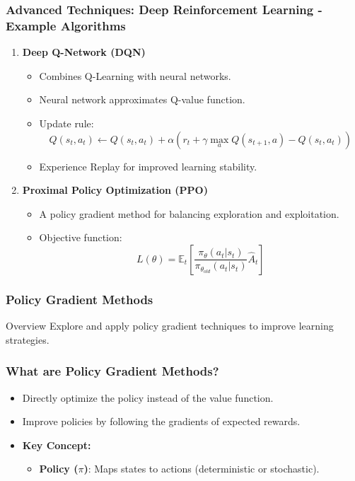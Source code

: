 \documentclass[aspectratio=169]{beamer}
\begin{document}
\begin{frame}[fragile]
    \frametitle{Advanced Techniques: Deep Reinforcement Learning - Example Algorithms}
    \begin{enumerate}
        \item \textbf{Deep Q-Network (DQN)}
        \begin{itemize}
            \item Combines Q-Learning with neural networks.
            \item Neural network approximates Q-value function.
            \item Update rule: 
            \begin{equation}
                Q(s_t, a_t) \leftarrow Q(s_t, a_t) + \alpha \left( r_t + \gamma \max_{a} Q(s_{t+1}, a) - Q(s_t, a_t) \right)
            \end{equation}
            \item Experience Replay for improved learning stability.
        \end{itemize}
        \item \textbf{Proximal Policy Optimization (PPO)}
        \begin{itemize}
            \item A policy gradient method for balancing exploration and exploitation.
            \item Objective function:
            \begin{equation}
                L(\theta) = \mathbb{E}_t \left[ \frac{\pi_\theta(a_t|s_t)}{\pi_{\theta_{old}}(a_t|s_t)} \hat{A}_t \right]
            \end{equation}
        \end{itemize}
    \end{enumerate}
\end{frame}

\begin{frame}[fragile]
    \frametitle{Policy Gradient Methods}
    \begin{block}{Overview}
        Explore and apply policy gradient techniques to improve learning strategies.
    \end{block}
\end{frame}

\begin{frame}[fragile]
    \frametitle{What are Policy Gradient Methods?}
    \begin{itemize}
        \item Directly optimize the policy instead of the value function.
        \item Improve policies by following the gradients of expected rewards.
        \item \textbf{Key Concept:} 
            \begin{itemize}
                \item \textbf{Policy ($\pi$)}: Maps states to actions (deterministic or stochastic).
            \end{itemize}
    \end{itemize}
\end{frame}
\end{document}
